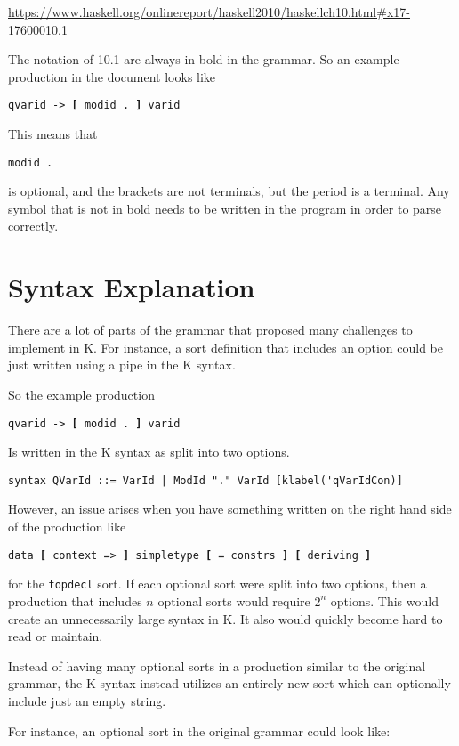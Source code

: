 \url{https://www.haskell.org/onlinereport/haskell2010/haskellch10.html#x17-17600010.1}

The notation of 10.1 are always in bold in the grammar.
So an example production in the document looks like

\texttt{qvarid -> \textbf{[} modid . \textbf{]} varid}

This means that 

\begin{lstlisting}
modid .
\end{lstlisting}

is optional, and the brackets are not terminals, but the period is a terminal. Any symbol that is not in bold needs to be written in the program in order to parse correctly.

\section{Syntax Explanation}
There are a lot of parts of the grammar that proposed many challenges to implement in K. For instance, a sort definition that includes an option could be just written using a pipe
in the K syntax.

So the example production

\texttt{qvarid -> \textbf{[} modid . \textbf{]} varid}

Is written in the K syntax as split into two options.

\begin{lstlisting}
syntax QVarId ::= VarId | ModId "." VarId [klabel('qVarIdCon)]
\end{lstlisting}

However, an issue arises when you have something written on the right hand side of the production like

\texttt{data \textbf{[} context => \textbf{]} simpletype \textbf{[} = constrs \textbf{]} \textbf{[} deriving \textbf{]}}

for the \texttt{topdecl} sort. If each optional sort were split into two options, then a production that includes $n$ optional sorts would require $2^n$ options. This would create an unnecessarily large syntax in K. It also would quickly become hard to read or maintain.

Instead of having many optional sorts in a production similar to the original grammar, the K syntax instead utilizes an entirely new sort which can optionally include just an empty string.

For instance, an optional sort in the original grammar could look like:

